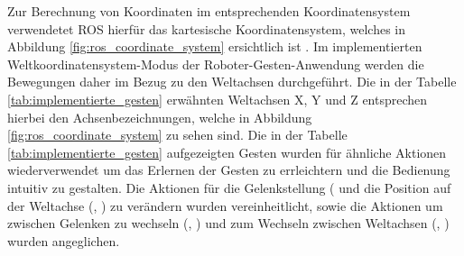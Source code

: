 Zur Berechnung von Koordinaten im entsprechenden Koordinatensystem verwendetet ROS hierfür das kartesische Koordinatensystem, welches in Abbildung \ref{fig:ros_coordinate_system} ersichtlich ist \cite{guo_irc-set_2019}. Im implementierten Weltkoordinatensystem-Modus der Roboter-Gesten-Anwendung werden die Bewegungen daher im Bezug zu den Weltachsen durchgeführt. Die in der Tabelle \ref{tab:implementierte_gesten} erwähnten Weltachsen X, Y und Z entsprechen hierbei den Achsenbezeichnungen, welche in Abbildung \ref{fig:ros_coordinate_system} zu sehen sind. Die in der Tabelle \ref{tab:implementierte_gesten} aufgezeigten Gesten wurden für ähnliche Aktionen wiederverwendet um das Erlernen der Gesten zu errleichtern und die Bedienung intuitiv zu gestalten. Die Aktionen für die Gelenkstellung ( und die Position auf der Weltachse (, ) zu verändern wurden vereinheitlicht, sowie die Aktionen um zwischen Gelenken zu wechseln (, ) und zum Wechseln zwischen Weltachsen (, ) wurden angeglichen.

